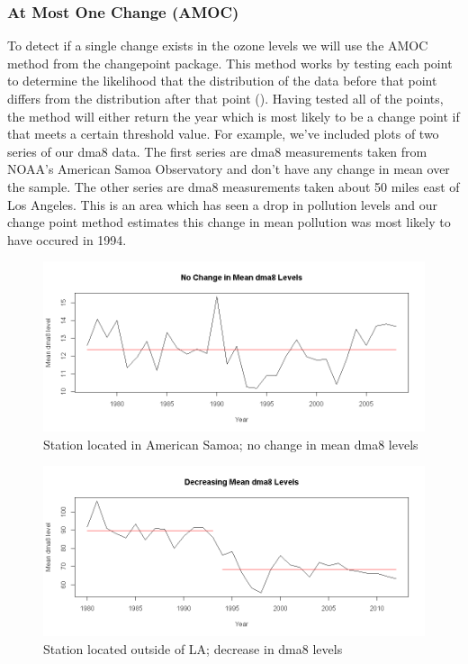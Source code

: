 \documentclass[11pt, oneside]{article}
\theoremstyle{definition}
\begin{document}
\subsubsection{At Most One Change (AMOC)} %
To detect if a single change exists in the ozone levels we will use the AMOC method from the changepoint package. This method works by testing each point to determine the likelihood that the distribution of the data before that point differs from the distribution after that point (\cite{changepoint}). Having tested all of the points, the method will either return the year which is most likely to be a change point if that meets a certain threshold value. For example, we've included plots of two series of our dma8 data. The first series are dma8 measurements taken from NOAA's American Samoa Observatory and don't have any change in mean over the sample. The other series are dma8 measurements taken about 50 miles east of Los Angeles. This is an area which has seen a drop in pollution levels and our change point method estimates this change in mean pollution was most likely to have occured in 1994.
\begin{figure}[ht]
    \centering
    \includegraphics[width=\linewidth]{plots/time_series/SMO514S00.png}
    \caption{Station located in American Samoa; no change in mean dma8 levels}
    \label{ts_samoa}
\end{figure}

\begin{figure}[ht]
    \centering
        \includegraphics[width=\linewidth]{plots/time_series/06-065-6001.png}
    \caption{Station located outside of LA; decrease in dma8 levels}
    \label{ts_la}
\end{figure}
\end{document}
